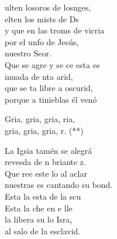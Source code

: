 \begin{cancion}%
	ulten losoros de losnges, \\
	elten los mists de Ds \\
	y que en las troms de vicria\\
	por el unfo de Jesús, \\
	nuestro Seor.\\
	Que se agre y se ce esta es\\
	inuada de nta arid, \\
	que se ta libre a oscurid,\\
	porque a  tinieblas él venó\\
	\begin{chorus}%
	Gria, gria, gria, ria,\\
	gria, gria, gria, r. (**)\\
	\end{chorus}%
	La Igsia tamén se alegrá\\
	revesda de n briante z.\\
	Que ree este lo al aclar\\
	nuestras es cantando su bond.\\
	Esta  la esta de la scu\\
	Esta  la che en e lle  \\
	la libera su lo Isra,\\
	al salo de la esclavid. \\

\end{cancion}
